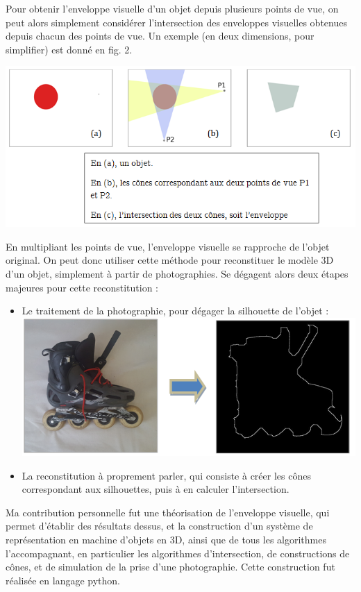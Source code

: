 \documentclass[a4paper]{article}
\begin{document}
      Pour obtenir l’enveloppe visuelle d’un objet depuis plusieurs points de vue, on peut alors simplement considérer l’intersection des enveloppes visuelles obtenues depuis chacun des points de vue. Un exemple (en deux dimensions, pour simplifier) est donné en fig. 2.

      \includegraphics[width=\textwidth]{ScreenSchema2}

      En multipliant les points de vue, l’enveloppe visuelle se rapproche de l’objet original. On peut donc utiliser cette méthode pour reconstituer le modèle 3D d’un objet, simplement à partir de photographies. Se dégagent alors deux étapes majeures pour cette reconstitution :

      \begin{itemize}
        \item Le traitement de la photographie, pour dégager la silhouette de l’objet :\\
        \includegraphics[width=\linewidth]{ContourDetect}
        \item La reconstitution à proprement parler, qui consiste à créer les cônes correspondant aux silhouettes, puis à en calculer l’intersection.
      \end{itemize}


      Ma contribution personnelle fut une théorisation de l’enveloppe visuelle, qui permet d’établir des résultats dessus, et la construction d’un système de représentation en machine d’objets en 3D, ainsi que de tous les algorithmes l’accompagnant, en particulier les algorithmes d’intersection, de constructions de cônes, et de simulation de la prise d’une photographie. Cette construction fut réalisée en langage python.
\end{document}
